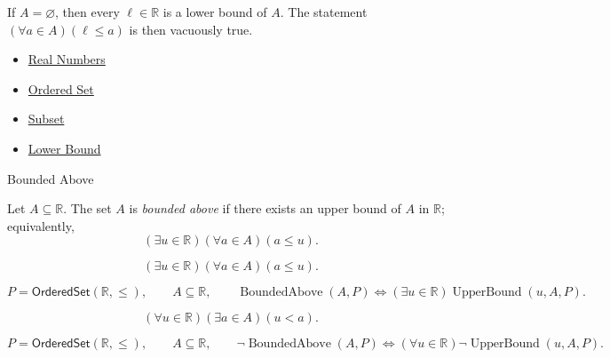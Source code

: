 \begin{remark*}[Exposition]
If $A=\varnothing$, then every $\ell\in\mathbb{R}$ is a lower bound of $A$.
The statement $(\forall a\in A)(\ell\leq a)$ is then vacuously true.
\end{remark*}

\begin{dependencies}
\begin{itemize}
  \item \hyperref[def:reals]{Real Numbers}
  \item \hyperref[def:ordered-set]{Ordered Set}
  \item \hyperref[def:subset]{Subset}
  \item \hyperref[def:lower-bound]{Lower Bound}
\end{itemize}
\end{dependencies}

\begin{definitionbox}{Bounded Above}
\begin{definition}
\label{def:bounded-above}
Let $A\subseteq\mathbb{R}$. The set $A$ is \emph{bounded above} if there
exists an upper bound of $A$ in $\mathbb{R}$; equivalently,
\[
  (\exists u\in\mathbb{R})(\forall a\in A)(a\leq u).
\]
\end{definition}
\end{definitionbox}

\begin{remark*}
\[
  (\exists u\in\mathbb{R})(\forall a\in A)(a\leq u).
\]
\end{remark*}

\begin{remark*}
\[
  P=\mathsf{OrderedSet}(\mathbb{R},\leq),\qquad A\subseteq\mathbb{R},\qquad
  \operatorname{BoundedAbove}(A,P)
  \Longleftrightarrow
  (\exists u\in\mathbb{R})\operatorname{UpperBound}(u,A,P).
\]
\end{remark*}

\begin{remark*}
\[
  (\forall u\in\mathbb{R})(\exists a\in A)(u<a).
\]
\end{remark*}

\begin{remark*}
\[
  P=\mathsf{OrderedSet}(\mathbb{R},\leq),\qquad A\subseteq\mathbb{R},\qquad
  \neg\operatorname{BoundedAbove}(A,P)
  \Longleftrightarrow
  (\forall u\in\mathbb{R})\neg\operatorname{UpperBound}(u,A,P).
\]
\end{remark*}

